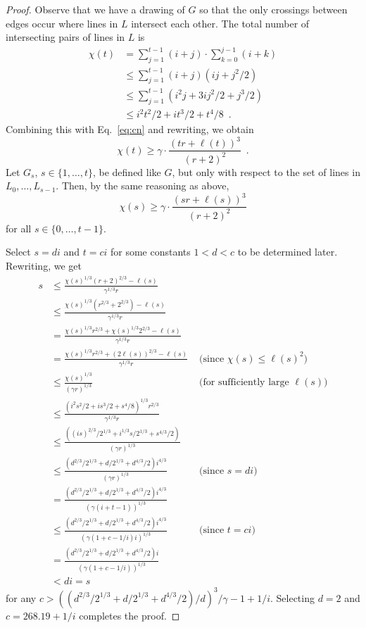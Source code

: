 \documentclass[12pt]{article}
\DeclareMathOperator{\cn}{cr}
\newcommand{\const}{268.19}
\begin{document}
\begin{proof}
Observe that we have a drawing of $G$ so that the only crossings between
edges occur where lines in $L$ intersect each other.  The total number of
intersecting pairs of lines in $L$ is 
\[
  \begin{aligned}
    \chi(t) 
      & = \sum_{j=1}^{t-1}(i+j)\cdot\sum_{k=0}^{j-1}(i+k) \\
      & \le \sum_{j=1}^{t-1}(i+j)(ij + j^2/2) \\
      & \le \sum_{j=1}^{t-1}(i^2j+3ij^2/2 + j^3/2) \\
      & \le i^2t^2/2 + it^3/2 + t^4/8 \enspace .
  \end{aligned}
\]
Combining this with Eq.~\ref{eq:cn} and rewriting, we obtain 
\[
  \chi(t)  \ge \gamma\cdot\frac{(tr+\ell(t))^3}{(r+2)^2} \enspace .
\]
Let $G_{s}$, $s\in\{1,\ldots,t\}$, be defined like $G$, but only with
respect to the set of lines in $L_0,\ldots,L_{s-1}$.  Then, by the same reasoning as above,
\[
  \chi(s) \ge \gamma\cdot\frac{(sr+\ell(s))^3}{(r+2)^2} 
\]
for all $s\in\{0,\ldots,t-1\}$.

Select $s=di$ and $t=ci$ for some constants $1 < d < c$ to be determined
later.
Rewriting, we get
\[
  \begin{aligned}
  s 
   &\le \frac{\chi(s)^{1/3} (r+2)^{2/3} - \ell(s)}{\gamma^{1/3}r} \\ 
   &\le \frac{\chi(s)^{1/3} (r^{2/3}+2^{2/3}) - \ell(s)}{\gamma^{1/3} r} \\
   & = \frac{\chi(s)^{1/3}r^{2/3}+\chi(s)^{1/3}2^{2/3} - \ell(s)}{\gamma^{1/3} r}  \\
   & = \frac{\chi(s)^{1/3}r^{2/3}+(2\ell(s))^{2/3} - \ell(s)}{\gamma^{1/3} r} 
    & \mbox{ (since $\chi(s) \le \ell(s)^2$)} \\
   &\le \frac{\chi(s)^{1/3}}{(\gamma r)^{1/3}}
    & \mbox{ (for sufficiently large $\ell(s)$)} \\
   &\le \frac{(i^2s^2/2 + is^3/2 + s^4/8)^{1/3}r^{2/3}}{\gamma^{1/3} r}  \\
   &\le \frac{((is)^{2/3}/2^{1/3} + i^{1/3}s/2^{1/3} + s^{4/3}/2)}{(\gamma r)^{1/3}}  \\
   &\le \frac{(d^{2/3}/2^{1/3}+d/2^{1/3}+d^{4/3}/2)i^{4/3}}{(\gamma r)^{1/3}}  
    & \mbox{ (since $s=di$)} \\
   & =  \frac{(d^{2/3}/2^{1/3}+d/2^{1/3}+d^{4/3}/2)i^{4/3}}{(\gamma(i+t-1))^{1/3}} \\ 
   &\le  \frac{(d^{2/3}/2^{1/3}+d/2^{1/3}+d^{4/3}/2)i^{4/3}}{(\gamma(1+c-1/i)i)^{1/3}}  
    & \mbox{ (since $t=ci$)} \\
   & =  \frac{(d^{2/3}/2^{1/3}+d/2^{1/3}+d^{4/3}/2)i}{(\gamma(1+c-1/i))^{1/3}} \\ 
   & < di = s
  \end{aligned}
\]
for any $c > ((d^{2/3}/2^{1/3}+d/2^{1/3}+d^{4/3}/2)/d)^3/\gamma-1+1/i$.
Selecting $d=2$ and $c=\const+1/i$ completes the proof.
\end{proof}
\end{document}
